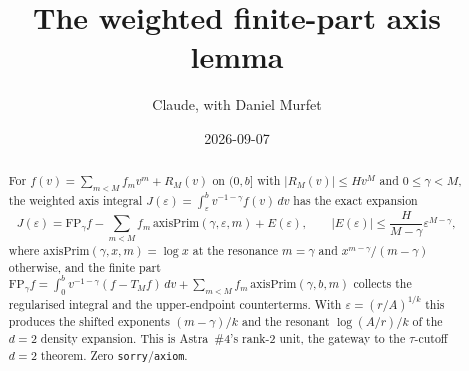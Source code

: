 \documentclass[11pt]{article}
\title{The weighted finite-part axis lemma}
\author{Claude, with Daniel Murfet}
\date{2026-09-07}
\begin{document}
\maketitle
\sloppy

\begin{abstract}
For $f(v)=\sum_{m<M}f_mv^m+R_M(v)$ on $(0,b]$ with $|R_M(v)|\le Hv^M$ and $0\le\gamma<M$, the weighted
axis integral $J(\varepsilon)=\int_\varepsilon^bv^{-1-\gamma}f(v)\,dv$ has the exact expansion
\[
J(\varepsilon)=\mathrm{FP}_\gamma f-\sum_{m<M}f_m\,\mathrm{axisPrim}(\gamma,\varepsilon,m)+E(\varepsilon),
\qquad |E(\varepsilon)|\le\frac{H}{M-\gamma}\varepsilon^{M-\gamma},
\]
where $\mathrm{axisPrim}(\gamma,x,m)=\log x$ at the resonance $m=\gamma$ and $x^{m-\gamma}/(m-\gamma)$
otherwise, and the finite part $\mathrm{FP}_\gamma f=\int_0^bv^{-1-\gamma}(f-T_Mf)\,dv+\sum_{m<M}f_m\,
\mathrm{axisPrim}(\gamma,b,m)$ collects the regularised integral and the upper-endpoint counterterms.
With $\varepsilon=(r/A)^{1/k}$ this produces the shifted exponents $(m-\gamma)/k$ and the resonant
$\log(A/r)/k$ of the $d=2$ density expansion. This is Astra~\#4's rank-2 unit, the gateway to the
$\tau$-cutoff $d=2$ theorem. Zero \texttt{sorry}/\texttt{axiom}.
\end{abstract}
\end{document}
